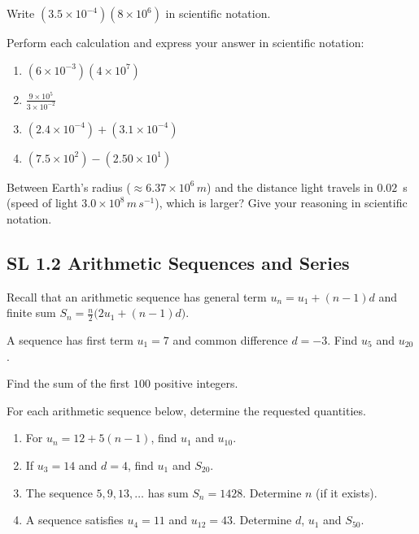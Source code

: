 \documentclass[11pt]{article}
\def\mathrm#1{#1}%
\newcommand{\tocsubsection}[1]{\subsection{#1}}
\newcounter{question}
\begin{document}
\begin{question}
Write $(3.5\times 10^{-4})(8\times 10^{6})$ in scientific notation.
\end{question}

\begin{question}
Perform each calculation and express your answer in scientific notation:
\begin{enumerate}[label=\alph*)]
\item $(6\times10^{-3})(4\times10^{7})$
\item $\displaystyle\frac{9\times10^{5}}{3\times10^{-2}}$
\item $(2.4\times10^{-4})+(3.1\times10^{-4})$
\item $(7.5\times10^{2})-(2.50\times10^{1})$
\end{enumerate}
\end{question}

\begin{question}
Between Earth's radius ($\approx 6.37\times10^{6}\,\mathrm{m}$) and the distance
light travels in $0.02$ s (speed of light $3.0\times10^{8}\,\mathrm{m\,s}^{-1}$),
which is larger?  Give your reasoning in scientific notation.
\end{question}

\tocsubsection{SL  1.2  \; Arithmetic  Sequences  and  Series}
Recall that an arithmetic sequence has general term $u_n=u_1+(n-1)d$ and
finite sum $S_n=\tfrac{n}{2}\bigl(2u_1+(n-1)d\bigr)$.

\begin{question}
A sequence has first term $u_1=7$ and common difference $d=-3$.  Find $u_5$ and
$u_{20}$.
\end{question}

\begin{question}
Find the sum of the first $100$ positive integers.
\end{question}

\begin{question}
For each arithmetic sequence below, determine the requested quantities.
\begin{enumerate}[label=\alph*)]
\item For $u_n=12+5(n-1)$, find $u_1$ and $u_{10}$.
\item If $u_3=14$ and $d=4$, find $u_1$ and $S_{20}$.
\item The sequence $5,9,13,\dots$ has sum $S_n=1428$.  Determine $n$ (if it exists).
\item A sequence satisfies $u_4=11$ and $u_{12}=43$.  Determine $d$, $u_1$ and
$S_{50}$.
\end{enumerate}
\end{question}
\end{document}
